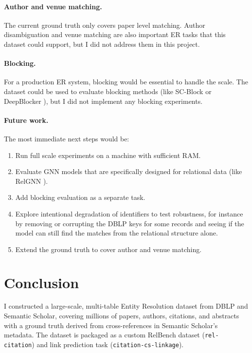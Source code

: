 \documentclass{article}
\begin{document}
\paragraph{Author and venue matching.}
The current ground truth only covers paper level matching.
Author disambiguation and venue matching are also important ER tasks that this dataset could support, but I did not address them in this project.

\paragraph{Blocking.}
For a production ER system, blocking would be essential to handle the scale.
The dataset could be used to evaluate blocking methods (like SC-Block \citep{scblock2023} or DeepBlocker \citep{thirumuruganathan2021deepblocker}), but I did not implement any blocking experiments.

\paragraph{Future work.}
The most immediate next steps would be:
\begin{enumerate}
    \item Run full scale experiments on a machine with sufficient RAM.
    \item Evaluate GNN models that are specifically designed for relational data (like RelGNN \citep{relgnn2025}).
    \item Add blocking evaluation as a separate task.
    \item Explore intentional degradation of identifiers to test robustness, for instance by removing or corrupting the DBLP keys for some records and seeing if the model can still find the matches from the relational structure alone.
    \item Extend the ground truth to cover author and venue matching.
\end{enumerate}


\section{Conclusion}
\label{sec:conclusion}

I constructed a large-scale, multi-table Entity Resolution dataset from DBLP and Semantic Scholar, covering millions of papers, authors, citations, and abstracts with a ground truth derived from cross-references in Semantic Scholar's metadata.
The dataset is packaged as a custom RelBench dataset (\texttt{rel-citation}) and link prediction task (\texttt{citation-cs-linkage}).
\end{document}
